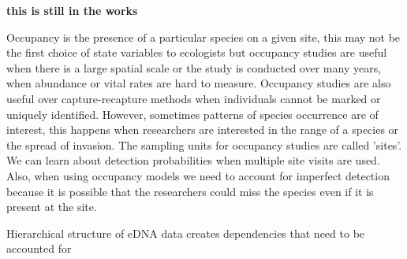 \documentclass[12pt]{article}\usepackage[]{graphicx}\usepackage[]{color}
\begin{document}
\textbf{this is still in the works}

Occupancy is the presence of a particular species on a given site, this may not be the first choice of state variables to ecologists but occupancy studies are useful when there is a large spatial scale or the study is conducted over many years, when abundance or vital rates are hard to measure. Occupancy studies are also useful over capture-recapture methods when individuals cannot be marked or uniquely identified. However, sometimes patterns of species occurrence are of interest, this happens when researchers are interested in the range of a species or the spread of invasion. The sampling units for occupancy studies are called 'sites'. We can learn about detection probabilities when multiple site visits are used. Also, when using occupancy models we need to account for imperfect detection because it is possible that the researchers could miss the species even if it is present at the site. 

Hierarchical structure of eDNA data creates dependencies that need to be accounted for \cite{MacKenzie}
\end{document}
